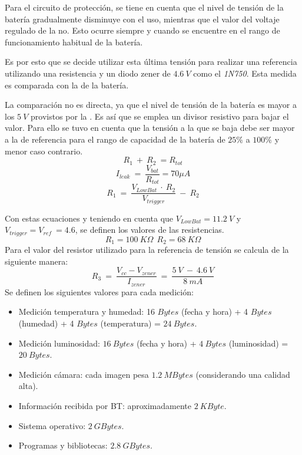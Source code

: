 Para el circuito de protección, se tiene en cuenta que el nivel de tensión de la batería gradualmente disminuye con el uso, mientras que el valor del voltaje regulado de la \rspi no. Esto ocurre siempre y cuando se encuentre en el rango de funcionamiento habitual de la batería.

Es por esto que se decide utilizar esta última tensión para realizar una referencia utilizando una resistencia y un diodo zener de $4.6 \ V$ como el \textit{1N750}. Esta medida es comparada con la de la  batería.

La comparación no es directa, ya que el nivel de tensión de la batería es mayor a los $5 \ V$ provistos por la \rspi. Es así que se emplea un divisor resistivo para bajar el valor. Para ello se tuvo en cuenta que la tensión a la que se baja debe ser mayor a la de referencia para el rango de capacidad de la batería de $25\%$ a $100\%$ y menor caso contrario.
\begin{equation}
R_1 \ +\ R_2 \ = R_{tot}
\end{equation}
\begin{equation}
I_{leak} \ = \ \frac{V_{bat}}{R_{tot}}  = 70 \mu A
\end{equation}
\begin{equation}
R_1 \ = \ \frac{V_{LowBat} \ \cdot \ R_2}{V_{trigger}} \ - \ R_2
\end{equation}

Con estas ecuaciones y teniendo en cuenta que $V_{LowBat} = 11.2 \ V$ y $V_{trigger} = V_{ref} \ = 4.6$, se definen los valores de las resistencias.
\begin{equation}
R_1 = 100 \ K\Omega  \ \ R_2 = 68 \ K\Omega
\end{equation}
Para el valor del resistor utilizado para la referencia de tensión se calcula de la siguiente manera:
\begin{equation}
	R_3 \ = \  \frac{V_{cc}-V_{zener}}{I_{zener}} \ = \  \frac{5 \ V \ - \ 4.6 \ V}{8 \ mA}
\end{equation}
Se definen los siguientes valores para cada medición:
\begin{itemize}
	\item Medición temperatura y humedad: 16 $Bytes$ (fecha y hora) + 4 $Bytes$ (humedad) + 4 $Bytes$ (temperatura) = $24 \ Bytes$.
	\item Medición luminosidad: $16 \ Bytes$ (fecha y hora) + $4 \ Bytes$ (luminosidad) = $20 \ Bytes$.
	\item Medición cámara: cada imagen pesa $1.2 \ MBytes$ \cite{ref:rpicam} (considerando una calidad alta).
	\item Información recibida por BT: aproximadamente $2 \ KByte$.
	\item Sistema operativo: $2 \ GBytes$.
	\item Programas y bibliotecas: $2.8 \ GBytes$.
\end{itemize}

